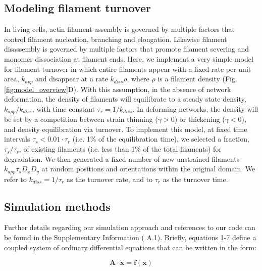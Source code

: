 \subsection{Modeling filament turnover}

In living cells, actin filament assembly is governed by multiple factors that control filament nucleation, branching and elongation. Likewise filament disassembly is governed by multiple factors that promote filament severing and monomer dissociation at filament ends. Here, we implement a very simple model for filament turnover in which entire filaments appear with a fixed rate per unit area, $k_{app}$ and disappear at a rate $k_{diss}\rho$, where $\rho$ is a filament density (Fig. \ref{fig:model_overview}D). With this assumption, in the absence of network deformation, the density of filaments will equilibrate to a steady state density, $k_{app}/k_{diss}$, with time constant $\tau_r = 1/k_{diss}$.   In deforming networks, the density will be set by a competition between strain thinning ($\gamma>0$) or thickening ($\gamma<0$), and density equilibration via turnover. To implement this model, at fixed time intervals $\tau_s < 0.01\cdot\tau_r$ (i.e. 1\% of the equilibration time), we selected a fraction, $\tau_s/\tau_r$, of existing filaments (i.e. less than 1\% of the total filaments) for degradation. We then generated a fixed number of new unstrained filaments $k_{app}\tau_sD_xD_y$ at random positions and orientations within the original domain.   We refer to $k_{diss}=1/\tau_r$ as the turnover rate, and to $\tau_r$ as the turnover time.


\subsection{Simulation methods}

Further details regarding our simulation approach and references to our code can be found in the Supplementary Information ( A.1). Briefly, equations 1-7 define a coupled system of ordinary differential equations that can be written in the form:

\begin{equation}
\mathbf{A \cdot \dot x} = \mathbf{f(x)}
\end{equation}

